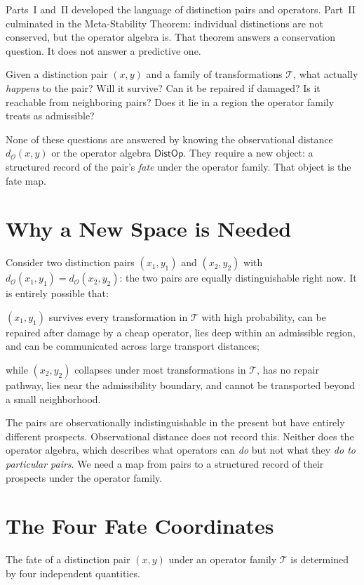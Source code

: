 \documentclass[12pt,twoside,openright]{book}
\newcommand{\transfam}{\mathcal{T}}       %
\newcommand{\distOp}{\mathsf{DistOp}}
\newcommand{\distMetric}{d_{\mathcal{O}}}
\begin{document}
Parts~I and~II developed the language of distinction pairs
and operators. Part~II culminated in the Meta-Stability
Theorem: individual distinctions are not conserved, but the
operator algebra is. That theorem answers a conservation
question. It does not answer a predictive one.

Given a distinction pair $(x,y)$ and a family of transformations
$\transfam$, what actually \emph{happens} to the pair? Will it
survive? Can it be repaired if damaged? Is it reachable from
neighboring pairs? Does it lie in a region the operator family
treats as admissible?

None of these questions are answered by knowing the observational
distance $\distMetric(x,y)$ or the operator algebra $\distOp$.
They require a new object: a structured record of the pair's
\emph{fate} under the operator family. That object is the fate
map.

\section{Why a New Space is Needed}

Consider two distinction pairs $(x_1,y_1)$ and $(x_2,y_2)$
with $\distMetric(x_1,y_1)=\distMetric(x_2,y_2)$: the two
pairs are equally distinguishable right now. It is entirely
possible that:

$(x_1,y_1)$ survives every transformation in $\transfam$ with
high probability, can be repaired after damage by a cheap
operator, lies deep within an admissible region, and can be
communicated across large transport distances;

while $(x_2,y_2)$ collapses under most transformations in
$\transfam$, has no repair pathway, lies near the admissibility
boundary, and cannot be transported beyond a small neighborhood.

The pairs are observationally indistinguishable in the present
but have entirely different prospects. Observational distance
does not record this. Neither does the operator algebra, which
describes what operators can \emph{do} but not what they
\emph{do to particular pairs}. We need a map from pairs to
a structured record of their prospects under the operator family.

\section{The Four Fate Coordinates}

The fate of a distinction pair $(x,y)$ under an operator family
$\transfam$ is determined by four independent quantities.
\end{document}
